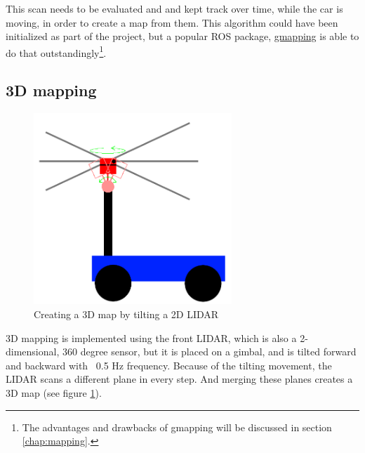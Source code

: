 This scan needs to be evaluated and and kept track over time, while the car is moving, in order to create a map from them. This algorithm could have been initialized as part of the project, but a popular ROS package, \href{http://wiki.ros.org/gmapping}{gmapping} is able to do that outstandingly\footnote{The advantages and drawbacks of gmapping will be discussed in section \ref{chap:mapping}.}.

\subsection{3D mapping}

\begin{figure}[!ht]
	\centering
	\includegraphics[height=72mm]{figures/raw/3D_lidar.png}
	\caption{Creating a 3D map by tilting a 2D LIDAR}
	\label{tilt_lidar}
\end{figure}

3D mapping is implemented using the front LIDAR, which is also a 2-dimensional, 360 degree sensor, but it is placed on a gimbal, and is tilted forward and backward with ~0.5 Hz frequency. Because of the tilting movement, the LIDAR scans a different plane in every step. And merging these planes creates a 3D map (see figure \ref{tilt_lidar}).

